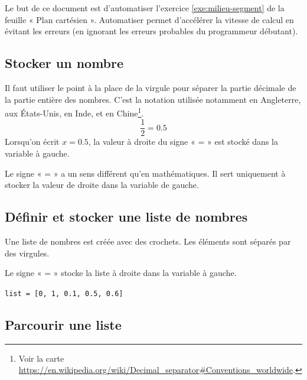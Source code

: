 

\AdvanceDate[0]


\pagestyle{fancy}
\fancyhead[R]{\today}

Le but de ce document est d'automatiser l'exercice \ref{exe:milieu-segment} de la feuille « Plan cartésien ».
Automatiser permet d'accélérer la vitesse de calcul en évitant les erreurs (en ignorant les erreurs probables du programmeur débutant).

\setcounter{Exercise}{11}


\subsection*{Stocker un nombre}

Il faut utiliser le point à la place de la virgule pour séparer la partie décimale de la partie entière des nombres. C'est la notation utilisée notamment en Angleterre, aux États-Unis, en Inde, et en Chine\footnote{Voir la carte \href{https://en.wikipedia.org/wiki/Decimal_separator\#Conventions_worldwide}{https://en.wikipedia.org/wiki/Decimal\_separator\#Conventions\_worldwide}.}.
	\[ \dfrac12 = 0.5 \] 
Lorsqu'on écrit $x=0.5$, la valeur à droite du signe « = » est stocké dans la variable à gauche.

\warning Le signe « = » a un sens différent qu'en mathématiques. Il sert uniquement à stocker la valeur de droite dans la variable de gauche.

\subsection*{Définir et stocker une liste de nombres}

Une liste de nombres est créée avec des crochets. Les éléments sont séparés par des virgules.

Le signe « = » stocke la liste à droite dans la variable à gauche.

\texttt{list = [0, 1, 0.1, 0.5, 0.6]}

\subsection*{Parcourir une liste}

